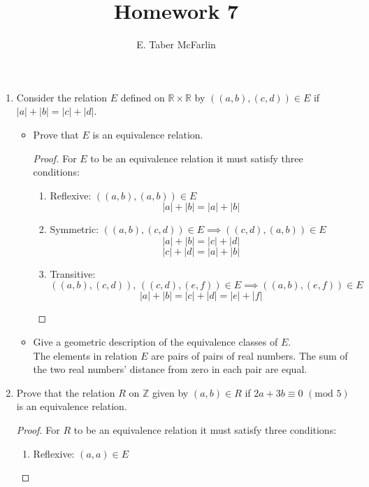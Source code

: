 \documentclass[12pt,a4paper,reqno,parskip=full]{amsart}
\numberwithin{equation}{section}
\theoremstyle{plain}
\theoremstyle{definition}
\begin{document}
\title{Homework 7}

\author{E. Taber McFarlin}

\maketitle

\begin{enumerate}
  \item Consider the relation $E$ defined on $\mathbb{R} \times\mathbb{R}$ by
        $\left((a,b),(c,d)\right)\in E$ if $|a|+|b| = |c|+|d|$.
        \begin{itemize}
          \item Prove that $E$ is an equivalence relation.
                \begin{proof}
                  For $E$ to be an equivalence relation it must satisfy three conditions:
                  \begin{enumerate}[i]
                    \item Reflexive: $((a,b), (a,b))\in E$
                          \[|a| + |b| = |a| + |b|\]
                    \item Symmetric: $((a,b), (c,d))\in E \implies ((c,d), (a,b))\in E$
                          \[|a| + |b| = |c| + |d|\]
                          \[|c| + |d| = |a| + |b|\]
                    \item Transitive:
                          $((a,b), (c,d)),\,((c,d), (e,f))\in E \implies ((a,b), (e,f))\in E$
                          \[|a| + |b| = |c| + |d| = |e| + |f|\]
                  \end{enumerate}
                \end{proof}
          \item Give a geometric description of the equivalence classes of $E$. \\
                The elements in relation $E$ are pairs of pairs of real numbers. The sum of the
                two real numbers' distance from zero in each pair are equal.
        \end{itemize}
  \item Prove that the relation $R$ on $\mathbb{Z}$ given by
        $(a,b)\in R$ if $2a+3b\equiv0\,\,(\text{mod}\,\,5)$ is an equivalence relation.
        \begin{proof}
          For $R$ to be an equivalence relation it must satisfy three conditions:
          \begin{enumerate}[i]
            \item Reflexive: $(a,a)\in E$

\end{enumerate}
\end{proof}
\end{enumerate}
\end{document}
